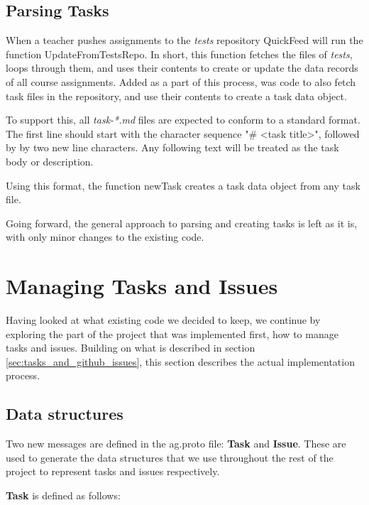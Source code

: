 \subsection{Parsing Tasks}

When a teacher pushes assignments to the \textit{tests} repository QuickFeed will run the function UpdateFromTestsRepo.
In short, this function fetches the files of \textit{tests}, loops through them, and uses their contents to create or update the data records of all course assignments.
Added as a part of this process, was code to also fetch task files in the repository, and use their contents to create a task data object.

To support this, all \textit{task-*.md} files are expected to conform to a standard format.
The first line should start with the character sequence "\# <task title>", followed by by two new line characters.
Any following text will be treated as the task body or description.

Using this format, the function newTask creates a task data object from any task file.



Going forward, the general approach to parsing and creating tasks is left as it is, with only minor changes to the existing code.

\section{Managing Tasks and Issues}

Having looked at what existing code we decided to keep, we continue by exploring the part of the project that was implemented first, how to manage tasks and issues.
Building on what is described in section \ref{sec:tasks_and_github_issues}, this section describes the actual implementation process.

\subsection{Data structures}

Two new messages are defined in the ag.proto file: \textbf{Task} and \textbf{Issue}.
These are used to generate the data structures that we use throughout the rest of the project to represent tasks and issues respectively.

\textbf{Task} is defined as follows:

